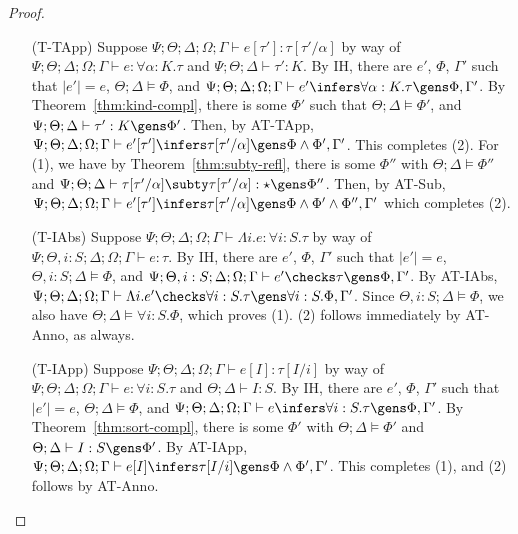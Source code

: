 \begin{proof}
\begin{itemize}
  \item[(T-TApp)] Suppose
  $\Psi ; \Theta ; \Delta ; \Omega ; \Gamma \vdash e [\tau'] : \tau[\tau'/\alpha]$ by way of
  $\Psi ; \Theta ; \Delta ; \Omega ; \Gamma \vdash e : \forall \alpha : K.\tau$ and
  $\Psi ; \Theta ; \Delta \vdash \tau' : K$.
  By IH, there are $e'$, $\Phi$, $\Gamma'$ such that
  $|e'| = e$,
  $\Theta ; \Delta \vDash \Phi$, and
  $\Psi ; \Theta ; \Delta ; \Omega ; \Gamma \vdash e' \infers \forall \alpha : K.\tau \gens \Phi,\Gamma'$.
  By Theorem~\ref{thm:kind-compl}, there is some $\Phi'$ such that
  $\Theta ; \Delta \vDash \Phi'$, and
  $\Psi ; \Theta ; \Delta \vdash \tau' : K \gens \Phi'$.
  Then, by AT-TApp,
  $\Psi ; \Theta ; \Delta ; \Omega ; \Gamma \vdash e' [\tau'] \infers \tau[\tau'/\alpha] \gens \Phi \wedge \Phi',\Gamma'$.
  This completes (2). For (1), we have
  by Theorem~\ref{thm:subty-refl}, there is some $\Phi''$ with
  $\Theta ; \Delta \vDash \Phi''$ and
  $\Psi ; \Theta ; \Delta \vdash \tau[\tau'/\alpha] \subty \tau[\tau'/\alpha] : \star \gens \Phi''$.
  Then, by AT-Sub,
  $\Psi ; \Theta ; \Delta ; \Omega ; \Gamma \vdash e' [\tau'] \infers \tau[\tau'/\alpha] \gens \Phi \wedge \Phi' \wedge \Phi'',\Gamma'$
  which completes (2).
  \item[(T-IAbs)] Suppose
  $\Psi ; \Theta ; \Delta ; \Omega ; \Gamma \vdash \Lambda i. e : \forall i : S. \tau$ by way of
  $\Psi ; \Theta, i : S ; \Delta ; \Omega ; \Gamma \vdash e : \tau$.
  By IH, there are $e'$, $\Phi$, $\Gamma'$ such that
  $|e'| = e$,
  $\Theta, i : S ; \Delta \vDash \Phi$, and
  $\Psi ; \Theta, i : S ; \Delta ; \Omega; \Gamma \vdash e' \checks \tau \gens \Phi,\Gamma'$.
  By AT-IAbs,
  $\Psi ; \Theta ; \Delta ; \Omega; \Gamma \vdash \Lambda i. e' \checks \forall i : S.\tau \gens \forall i : S.\Phi,\Gamma'$.
  Since $\Theta, i : S ; \Delta \vDash \Phi$, we also have $\Theta ; \Delta \vDash \forall i : S. \Phi$, which proves (1).
  (2) follows immediately by AT-Anno, as always.
  
  
  \item[(T-IApp)] Suppose
  $\Psi ; \Theta ; \Delta ; \Omega ; \Gamma \vdash e [I] : \tau[I/i]$ by way of
  $\Psi ; \Theta ; \Delta ; \Omega ; \Gamma \vdash e : \forall i : S.\tau$ and
  $\Theta ; \Delta \vdash I : S$.
  By IH, there are $e'$, $\Phi$, $\Gamma'$ such that
  $|e'| = e$,
  $\Theta ; \Delta \vDash \Phi$, and
  $\Psi ; \Theta ; \Delta ; \Omega; \Gamma \vdash e \infers \forall i : S. \tau \gens \Phi,\Gamma'$.
  By Theorem~\ref{thm:sort-compl}, there is some $\Phi'$ with
  $\Theta ; \Delta \vDash \Phi'$ and
  $\Theta ; \Delta \vdash I : S \gens \Phi'$.
  By AT-IApp,
  $\Psi ; \Theta ; \Delta ; \Omega; \Gamma \vdash e [I] \infers \tau[I/i] \gens \Phi \wedge \Phi',\Gamma'$.
  This completes (1), and (2) follows by AT-Anno.
  

\end{itemize}
\end{proof}
